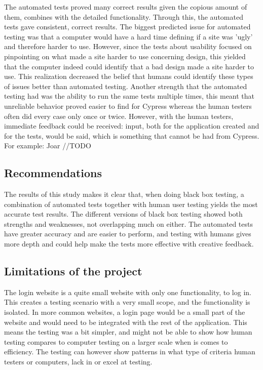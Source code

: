 \documentclass[journal,twocolumn]{IEEEtran}
\begin{document}
The automated tests proved many correct results given the copious amount of them, combines with the detailed functionality. Through this, the automated tests gave consistent, correct results. The biggest predicted issue for automated testing was that a computer would have a hard time defining if a site was 'ugly' and therefore harder to use. However, since the tests about usability focused on pinpointing on what made a site harder to use concerning design, this yielded that the computer indeed could identify that a bad design made a site harder to use.
This realization decreased the belief that humans could identify these types of issues better than automated testing.
Another strength that the automated testing had was the ability to run the same tests multiple times, this meant that unreliable behavior proved easier to find for Cypress whereas the human testers often did every case only once or twice.
However, with the human testers, immediate feedback could be received: input, both for the application created and for the tests, would be said, which is something that cannot be had from Cypress. For example: Joar //TODO

\subsection{Recommendations}
The results of this study makes it clear that, when doing black box testing, a combination of automated tests together with human user testing yields the most accurate test results. The different versions of black box testing showed both strengths and weaknesses, not overlapping much on either. The automated tests have greater accuracy and are easier to perform, and testing with humans gives more depth and could help make the tests more effective with creative feedback.

\subsection{Limitations of the project}
The login website is a quite small website with only one functionality, to log in. This creates a testing scenario with a very small scope, and the functionality is isolated. In more common websites, a login page would be a small part of the website and would need to be integrated with the rest of the application. This means the testing was a bit simpler, and might not be able to show how human testing compares to computer testing on a larger scale when is comes to efficiency. The testing can however show patterns in what type of criteria human testers or computers, lack in or excel at testing.
\end{document}
